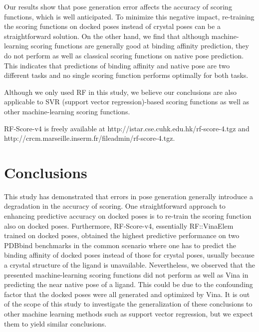 \documentclass[twocolumn]{bmcart}
\begin{document}
Our results show that pose generation error affects the accuracy of scoring functions, which is well anticipated. To minimize this negative impact, re-training the scoring functions on docked poses instead of crystal poses can be a straightforward solution. On the other hand, we find that although machine-learning scoring functions are generally good at binding affinity prediction, they do not perform as well as classical scoring functions on native pose prediction. This indicates that predictions of binding affinity and native pose are two different tasks and no single scoring function performs optimally for both tasks.

Although we only used RF in this study, we believe our conclusions are also applicable to SVR (support vector regression)-based scoring functions \cite{1295,963} as well as other machine-learning scoring functions.

RF-Score-v4 is freely available at http://istar.cse.cuhk.edu.hk/rf-score-4.tgz and http://crcm.marseille.inserm.fr/fileadmin/rf-score-4.tgz.

\section*{Conclusions}

This study has demonstrated that errors in pose generation generally introduce a degradation in the accuracy of scoring. One straightforward approach to enhancing predictive accuracy on docked poses is to re-train the scoring function also on docked poses. Furthermore, RF-Score-v4, essentially RF::VinaElem trained on docked poses, obtained the highest predictive performance on two PDBbind benchmarks in the common scenario where one has to predict the binding affinity of docked poses instead of those for crystal poses, usually because a crystal structure of the ligand is unavailable. Nevertheless, we observed that the presented machine-learning scoring functions did not perform as well as Vina in predicting the near native pose of a ligand. This could be due to the confounding factor that the docked poses were all generated and optimized by Vina. It is out of the scope of this study to investigate the generalization of these conclusions to other machine learning methods such as support vector regression, but we expect them to yield similar conclusions.

\end{document}
